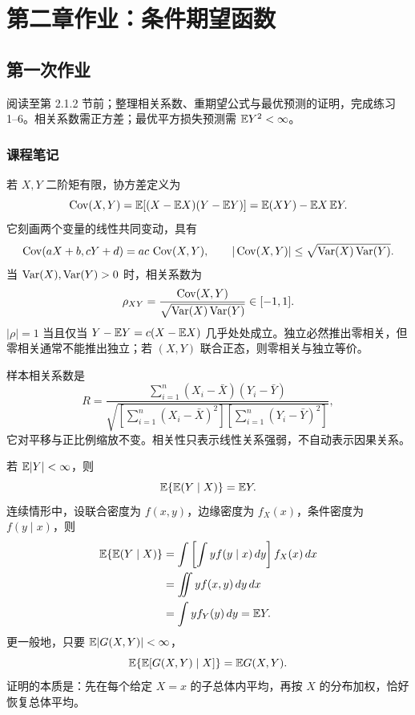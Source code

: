\begingroup
\chapter*{第二章作业：条件期望函数}
\setcounter{section}{0}
\renewcommand{\thesection}{\arabic{section}}
\renewcommand{\thechapter}{2}
\renewcommand{\theHsection}{reg.homework.2.\arabic{section}}

\section{第一次作业}\label{hw:reg:assignment:1}

阅读至第 2.1.2 节前；整理相关系数、重期望公式与最优预测的证明，完成练习 1--6。相关系数需正方差；最优平方损失预测需 $\mathbb{E} Y^2<\infty$。

\subsection*{课程笔记}

\begin{proposition}\label{hw:reg:note:1:1}
若 $X,Y$ 二阶矩有限，协方差定义为
\[
\operatorname{Cov}(X,Y)=\mathbb{E}[(X-\mathbb{E} X)(Y-\mathbb{E} Y)]
=\mathbb{E}(XY)-\mathbb{E} X\,\mathbb{E} Y.
\]
它刻画两个变量的线性共同变动，具有
\[
\operatorname{Cov}(aX+b,cY+d)=ac\,\operatorname{Cov}(X,Y),\qquad
|\operatorname{Cov}(X,Y)|\leq\sqrt{\operatorname{Var}(X)\operatorname{Var}(Y)}.
\]
当 $\operatorname{Var}(X),\operatorname{Var}(Y)>0$ 时，相关系数为
\[
\rho_{XY}=\frac{\operatorname{Cov}(X,Y)}
{\sqrt{\operatorname{Var}(X)\operatorname{Var}(Y)}}\in[-1,1].
\]
$|\rho|=1$ 当且仅当 $Y-\mathbb{E} Y=c(X-\mathbb{E} X)$ 几乎处处成立。独立必然推出零相关，但零相关通常不能推出独立；若 $(X,Y)$ 联合正态，则零相关与独立等价。

样本相关系数是
\[
R=\frac{\sum_{i=1}^n(X_i-\bar X)(Y_i-\bar Y)}
{\sqrt{
\left[\sum_{i=1}^n(X_i-\bar X)^2\right]
\left[\sum_{i=1}^n(Y_i-\bar Y)^2\right]
}},
\]
它对平移与正比例缩放不变。相关性只表示线性关系强弱，不自动表示因果关系。
\end{proposition}

\begin{proposition}\label{hw:reg:note:1:2}
若 $\mathbb{E}|Y|<\infty$，则
\[
\mathbb{E}\{\mathbb{E}(Y\mid X)\}=\mathbb{E} Y.
\]
连续情形中，设联合密度为 $f(x,y)$，边缘密度为 $f_X(x)$，条件密度为 $f(y\mid x)$，则
\begin{align*}
\mathbb{E}\{\mathbb{E}(Y\mid X)\}
&=\int\left[\int y f(y\mid x)\,dy\right]f_X(x)\,dx\\
&=\iint y f(x,y)\,dy\,dx\\
&=\int y f_Y(y)\,dy=\mathbb{E} Y.
\end{align*}
更一般地，只要 $\mathbb{E}|G(X,Y)|<\infty$，
\[
\mathbb{E}\{\mathbb{E}[G(X,Y)\mid X]\}=\mathbb{E} G(X,Y).
\]
证明的本质是：先在每个给定 $X=x$ 的子总体内平均，再按 $X$ 的分布加权，恰好恢复总体平均。
\end{proposition}

